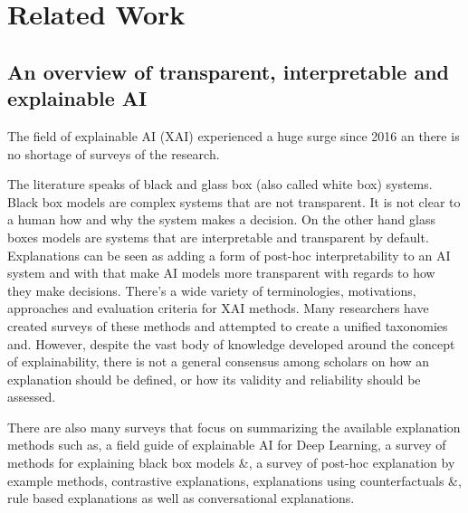 \documentclass[manuscript,screen,review]{acmart}
\begin{document}
\newpage
\section{Related Work}\label{sec:related-work}
%
%

\subsection{An overview of transparent, interpretable and explainable AI}\label{subsec:an-overview-of-transparent-interpretable-and-explainable-ai}
The field of explainable AI (XAI) experienced a huge surge since 2016 an there is no shortage of surveys of the research.

The literature speaks of black and glass box (also called white box) systems.
Black box models are complex systems that are not transparent.
It is not clear to a human how and why the system makes a decision.
On the other hand glass boxes models are systems that are interpretable and transparent by default.
Explanations can be seen as adding a form of post-hoc interpretability to an AI system and with that make AI models more transparent with regards to how they make decisions.
There's a wide variety of terminologies, motivations, approaches and evaluation criteria for XAI methods.
Many researchers have created surveys of these methods and attempted to create a unified taxonomies \cite{Linardatos2021} and\cite{Schwalbe2021}.
However, despite the vast body of knowledge developed around the concept of explainability, there is not a general consensus among scholars on how an explanation should be defined, or how its validity and reliability should be assessed\cite{Vilone2021}.

There are also many surveys that focus on summarizing the available explanation methods such as\cite{Vilone2020},
a field guide of explainable AI for Deep Learning\cite{Ras2020}, a survey of methods for explaining black box models\cite{Guidotti2018a} \&\cite{Adadi2018},
a survey of post-hoc explanation by example methods\cite{Keane2019}, contrastive explanations\cite{Miller2021},
explanations using counterfactuals\cite{Verma2020} \&\cite{Keane2020}, rule based explanations\cite{Guidotti2018} as well
as conversational explanations\cite{Sokol2018}.
\end{document}

